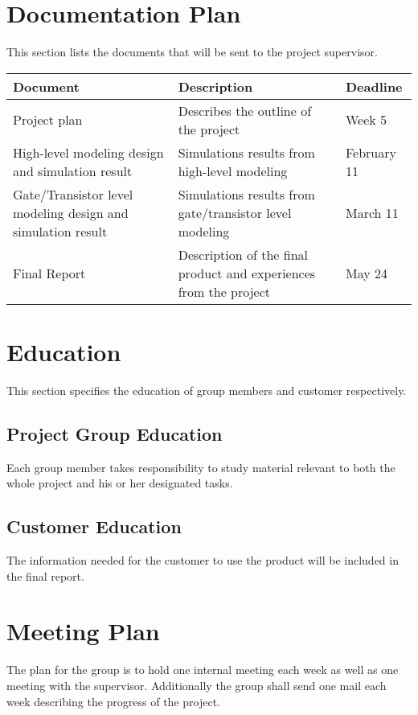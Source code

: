 \documentclass[a4paper,12pt]{article} \usepackage{graphicx}
\begin{document}
\section{Documentation Plan}
This section lists the documents that will be sent to the project supervisor.

\begin{longtable}{|p{40mm}|p{80mm}|p{30mm}|}
        \hline
        \textbf{Document} & \textbf{Description} & \textbf{Deadline} \\
        \hline
        Project plan & Describes the outline of the project & Week 5 \\
        \hline
        High-level modeling design and simulation result & Simulations results from high-level modeling & February 11 \\
        \hline
        Gate/Transistor level modeling design and simulation result  & Simulations results from gate/transistor level modeling & March 11 \\
        \hline
        Final Report & Description of the final product and experiences from the project & May 24 \\
        \hline
\end{longtable}


\section{Education}
This section specifies the education of group members and customer respectively.
\subsection{Project Group Education}
Each group member takes responsibility to study material relevant to both the
whole project and his or her designated tasks. 

\subsection{Customer Education}
The information needed for the customer to use the product will be included in
the final report.

\section{Meeting Plan}
The plan for the group is to hold one internal meeting each week as well as one meeting with the supervisor.
Additionally the group shall send one mail each week describing the progress of the project.
\end{document}
